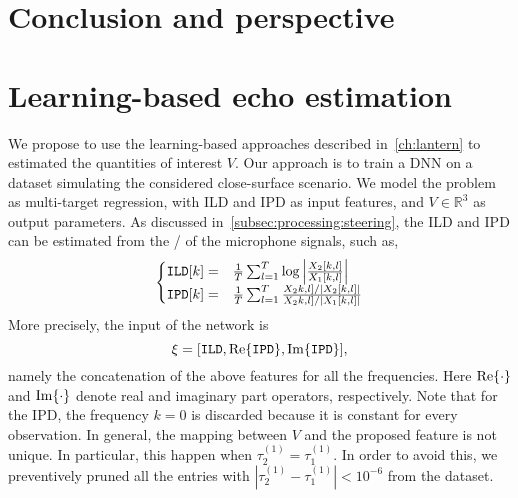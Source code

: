 \section{Conclusion and perspective}

\section{Learning-based echo estimation}
We propose to use the learning-based approaches described in~\cref{ch:lantern} to estimated the quantities of interest $V$.
Our approach is to train a \ac{DNN} on a dataset simulating the considered close-surface scenario.
We model the problem as multi-target regression, with \acf{ILD} and \acf{IPD} as input features, and $V \in \mathbb{R}^3$ as output parameters.
As discussed in~\cref{subsec:processing:steering}, the \ac{ILD} and \ac{IPD} can be estimated from the \STFT/ of the microphone signals, such as,
\begin{equation} \label{eq:mirage:features}
\begin{cases}
    \ild[k]  =& \tfrac{1}{T} \sum_{l=1}^T \log{\abs{\frac{\MIC_2[k,l]}{\MIC_1[k,l]}}} \\
    \ipd[k]  =& \tfrac{1}{T} \sum_{l=1}^T \frac{\MIC_2k,l]/ \abs{\MIC_2[k,l]}}{ \MIC_2k,l] / \abs{\MIC_1[k,l]}}\\
\end{cases}
\end{equation}
More precisely, the input of the network is
\begin{equation*}
    \xi = \klist{ \ild, \kRe\set{\ipd}, \kIm\set{\ipd}}
    ,
\end{equation*}
namely the concatenation of the above features for all the frequencies.
Here $\kRe\set{\cdot}$ and $\kIm\set{\cdot}$ denote real and imaginary part operators, respectively.
Note that for the \ac{IPD}, the frequency $k=0$ is discarded because it is constant for every observation.
In general, the mapping between $V$ and the proposed feature is not unique.
In particular, this happen when $\tau_2^{(1)} = \tau_1^{(1)}$.
In order to avoid this, we preventively pruned all the entries with $| \tau_2^{(1)} - \tau_1^{(1)} | < 10^{-6}$ from the dataset.

